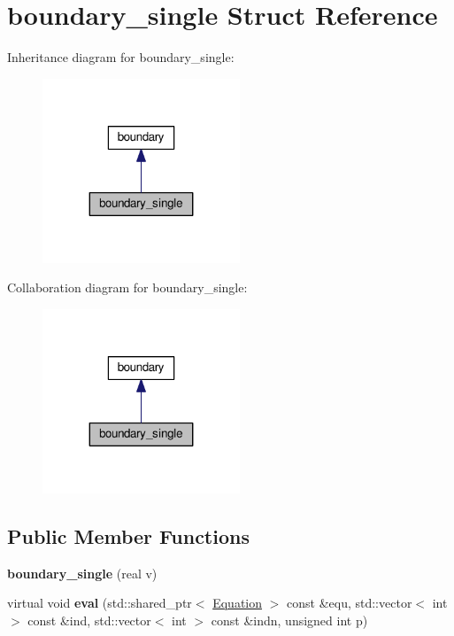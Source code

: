 \hypertarget{structboundary__single}{\section{boundary\+\_\+single Struct Reference}
\label{structboundary__single}
}


Inheritance diagram for boundary\+\_\+single\+:\nopagebreak
\begin{figure}[H]
\begin{center}
\leavevmode
\includegraphics[width=167pt]{structboundary__single__inherit__graph}
\end{center}
\end{figure}


Collaboration diagram for boundary\+\_\+single\+:\nopagebreak
\begin{figure}[H]
\begin{center}
\leavevmode
\includegraphics[width=167pt]{structboundary__single__coll__graph}
\end{center}
\end{figure}
\subsection*{Public Member Functions}
\begin{DoxyCompactItemize}
\item 
\hypertarget{structboundary__single_a794dda44938818af0e3f015b979a3d2f}{{\bfseries boundary\+\_\+single} (real v)}\label{structboundary__single_a794dda44938818af0e3f015b979a3d2f}

\item 
\hypertarget{structboundary__single_ad348670e49f4b8ab96cc35bce428a3f7}{virtual void {\bfseries eval} (std\+::shared\+\_\+ptr$<$ \hyperlink{classEquation}{Equation} $>$ const \&equ, std\+::vector$<$ int $>$ const \&ind, std\+::vector$<$ int $>$ const \&indn, unsigned int p)}\label{structboundary__single_ad348670e49f4b8ab96cc35bce428a3f7}

\end{DoxyCompactItemize}
